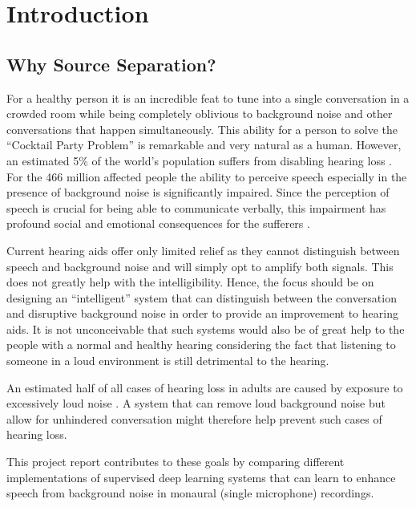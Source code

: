 
\chapter{Introduction} %

\label{Chapter1} %


\newcommand{\keyword}[1]{\textbf{#1}}
\newcommand{\tabhead}[1]{\textbf{#1}}
\newcommand{\code}[1]{\texttt{#1}}
\newcommand{\file}[1]{\texttt{\bfseries#1}}
\newcommand{\option}[1]{\texttt{\itshape#1}}


\section{Why Source Separation?}
For a healthy person it is an incredible feat to tune into a single conversation in a crowded room while being completely oblivious to background noise and other conversations that happen simultaneously. This ability for a person to solve the \enquote{Cocktail Party Problem}\cite{wiki:cock} is remarkable and very natural as a human. However, an estimated 5\% of the world’s population suffers from disabling hearing loss \cite{ref:who}. For the 466 million affected people the ability to perceive speech especially in the presence of background noise is significantly impaired. Since the perception of speech is crucial for being able to communicate verbally, this impairment has profound social and emotional consequences for the sufferers \cite{ref:who}.\par 
Current hearing aids offer only limited relief as they cannot distinguish between speech and background noise and will simply opt to amplify both signals. This does not greatly help with the intelligibility. Hence, the focus should be on designing an “intelligent” system that can distinguish between the conversation and disruptive background noise in order to provide an improvement to hearing aids. It is not unconceivable that such systems would also be of great help to the people with a normal and healthy hearing considering the fact that listening to someone in a loud environment is still detrimental to the hearing. \par An estimated half of all cases of hearing loss in adults are caused by exposure to excessively loud noise \cite{ref:deb}. A system that can remove loud background noise but allow for unhindered conversation might therefore help prevent such cases of hearing loss.\par
This project report contributes to these goals by comparing different implementations of supervised deep learning systems that can learn to enhance speech from background noise in monaural (single microphone) recordings. \par

